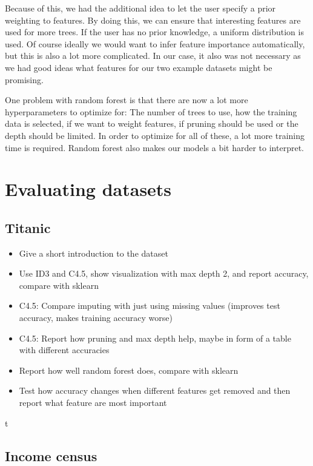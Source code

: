 \documentclass[a4paper]{article}
\begin{document}
Because of this, we had the additional idea to let the user specify a prior weighting to features. By doing this, we can ensure that interesting features are used for more trees. If the user has no prior knowledge, a uniform distribution is used. Of course ideally we would want to infer feature importance automatically, but this is also a lot more complicated. In our case, it also was not necessary as we had good ideas what features for our two example datasets might be promising.

One problem with random forest is that there are now a lot more hyperparameters to optimize for: The number of trees to use, how the training data is selected, if we want to weight features, if pruning should be used or the depth should be limited. In order to optimize for all of these, a lot more training time is required. Random forest also makes our models a bit harder to interpret.

\section{Evaluating datasets}

\subsection{Titanic}

\begin{itemize}
	\item Give a short introduction to the dataset
    \item Use ID3 and C4.5, show visualization with max depth 2, and report accuracy, compare with sklearn
    \item C4.5: Compare imputing with just using missing values (improves test accuracy, makes training accuracy worse)
    \item C4.5: Report how pruning and max depth help, maybe in form of a table with different accuracies
    \item Report how well random forest does, compare with sklearn
    \item Test how accuracy changes when different features get removed and then report what feature are most important
\end{itemize}t

\subsection{Income census}
\end{document}
